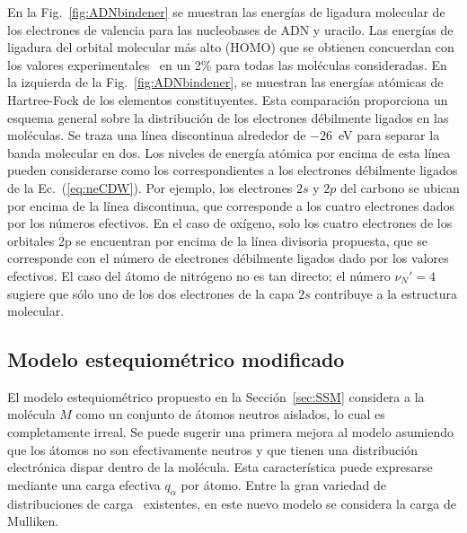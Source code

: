 En la Fig.~\ref{fig:ADNbindener} se muestran las energías de ligadura 
molecular de los electrones de valencia para las nucleobases de ADN y 
uracilo. Las energías de ligadura del orbital molecular más alto (HOMO) 
que se obtienen concuerdan con los valores 
experimentales~\cite{Hush,Verkin,Dougherty} en un 2\% para todas las 
moléculas consideradas. En la izquierda de la Fig.~\ref{fig:ADNbindener}, 
se muestran las energías atómicas de Hartree-Fock de los elementos 
constituyentes. Esta comparación proporciona un esquema general sobre la 
distribución de los electrones débilmente ligados en las moléculas. Se 
traza una línea discontinua alrededor de $-26$~eV para separar la banda 
molecular en dos. Los niveles de energía atómica por encima de esta 
línea pueden considerarse como los correspondientes a los electrones 
débilmente ligados de la Ec.~(\ref{eq:neCDW}). Por ejemplo, los 
electrones $2s$ y $2p$ del carbono se ubican por encima de la línea 
discontinua, que corresponde a los cuatro electrones dados por los 
números efectivos. En el caso de oxígeno, 
solo los cuatro electrones de los orbitales 2p se encuentran por encima 
de la línea divisoria propuesta, que se corresponde con el número de 
electrones débilmente ligados dado por los valores efectivos. El caso 
del átomo de nitrógeno no es tan directo; el número $\nu_{N}'=4$ 
sugiere que sólo uno de los dos electrones de la capa $2s$ contribuye a
la estructura molecular.

\subsection{Modelo estequiométrico modificado}

El modelo estequiométrico propuesto en la Sección~\ref{sec:SSM} 
considera a la molécula $M$ como un conjunto de átomos neutros aislados, 
lo cual es completamente irreal. Se puede sugerir una primera mejora al 
modelo asumiendo que los átomos no son efectivamente neutros y que 
tienen una distribución electrónica dispar dentro de la molécula. Esta 
característica puede expresarse mediante una carga efectiva $q_{\alpha}$ 
por átomo. Entre la gran variedad de distribuciones de 
carga~\cite{lee2003} existentes, en este nuevo modelo se considera la 
carga de Mulliken.

